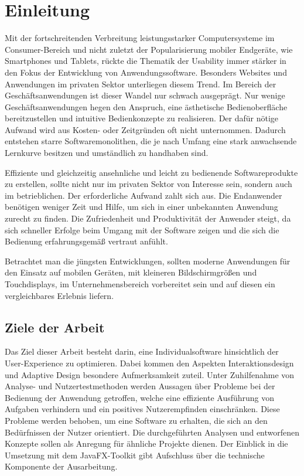 \chapter{Einleitung}
Mit der fortschreitenden Verbreitung leistungsstarker Computersysteme im Consumer-Bereich und nicht zuletzt der Popularisierung mobiler Endgeräte, wie Smartphones und Tablets, rückte die Thematik der Usability immer stärker in den Fokus der Entwicklung von Anwendungssoftware. Besonders Websites und Anwendungen im privaten Sektor unterliegen diesem Trend. Im Bereich der Geschäftsanwendungen ist dieser Wandel nur schwach ausgeprägt. Nur wenige Geschäftsanwendungen hegen den Anspruch, eine ästhetische Bedienoberfläche bereitzustellen und intuitive Bedienkonzepte zu realisieren. Der dafür nötige Aufwand wird aus Kosten- oder Zeitgründen oft nicht unternommen. Dadurch entstehen starre Softwaremonolithen, die je nach Umfang eine stark anwachsende Lernkurve besitzen und umständlich zu handhaben sind.\par
Effiziente und gleichzeitig ansehnliche und leicht zu bedienende Softwareprodukte zu erstellen, sollte nicht nur im privaten Sektor von Interesse sein, sondern auch im betrieblichen. Der erforderliche Aufwand zahlt sich aus. Die Endanwender benötigen weniger Zeit und Hilfe, um sich in einer unbekannten Anwendung zurecht zu finden. Die Zufriedenheit und Produktivität der Anwender steigt, da sich schneller Erfolge beim Umgang mit der Software zeigen und die sich die Bedienung erfahrungsgemäß vertraut anfühlt.\par
Betrachtet man die jüngsten Entwicklungen, sollten moderne Anwendungen für den Einsatz auf mobilen Geräten, mit kleineren Bildschirmgrößen und Touchdisplays, im Unternehmensbereich vorbereitet sein und auf diesen ein vergleichbares Erlebnis liefern.\par
\section{Ziele der Arbeit} \label{sec:einlZiel}
Das Ziel dieser Arbeit besteht darin, eine Individualsoftware hinsichtlich der User-Experience zu optimieren. Dabei kommen den Aspekten Interaktionsdesign und Adaptive Design besondere Aufmerksamkeit zuteil. Unter Zuhilfenahme von Analyse- und Nutzertestmethoden werden Aussagen über Probleme bei der Bedienung der Anwendung getroffen, welche eine effiziente Ausführung von Aufgaben verhindern und ein positives Nutzerempfinden einschränken. Diese Probleme werden behoben, um eine Software zu erhalten, die sich an den Bedürfnissen der Nutzer orientiert. Die durchgeführten Analysen und entworfenen Konzepte sollen als Anregung für ähnliche Projekte dienen. Der Einblick in die Umsetzung mit dem JavaFX-Toolkit gibt Aufschluss über die technische Komponente der Ausarbeitung.\par
